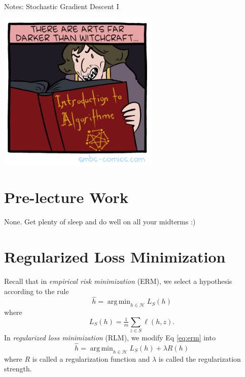 \documentclass[10pt]{article}
\theoremstyle{definition}
\DeclareMathOperator*{\argmin}{arg\,min}
\begin{document}
\begin{center}
\Huge
Notes: Stochastic Gradient Descent I
\end{center}

\begin{center}
    \includegraphics[height=3in]{smbc-1526816148-20180520-panel.png}
\end{center}


\section{Pre-lecture Work}

None.
Get plenty of sleep and do well on all your midterms :)



\section{Regularized Loss Minimization}

Recall that in \emph{empirical risk minimization} (ERM), we select a hypothesis according to the rule
\begin{equation}
    \hat h = \argmin_{h\in\mathcal H} L_S(h)
    \label{eq:erm}
\end{equation}
where
\begin{equation}
    L_S(h) = \tfrac 1 m \sum_{z\in S} \ell(h,z)
    .
\end{equation}
In \emph{regularized loss minimization} (RLM), we modify Eq \ref{eq:erm} into
\begin{equation}
    \hat h = \argmin_{h\in\mathcal H} L_S(h) + \lambda R(h)
\end{equation}
where $R$ is called a regularization function and $\lambda$ is called the regularization strength.
\end{document}
